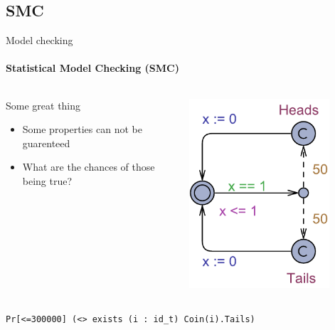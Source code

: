\subsection{SMC}
\begin{frame}[t]{Model checking}
	\framesubtitle{Statistical Model Checking (SMC)}
	\begin{columns}[T]
		\begin{column}{.48\textwidth}
			Some great thing
			
			\begin{itemize}
				\item<+-> Some properties can not be guarenteed
				\item<+-> What are the chances of those being true?
			\end{itemize}
		\end{column}
		\begin{column}{.48\textwidth}
			\includegraphics[trim=0 200 0 200,width=0.8\textwidth]{images/Simple_SMC.pdf}
		\end{column}
	\end{columns}
	\vspace{80pt}
	\texttt{Pr[<=300000] (<> exists (i : id\_t) Coin(i).Tails)}
\end{frame}
